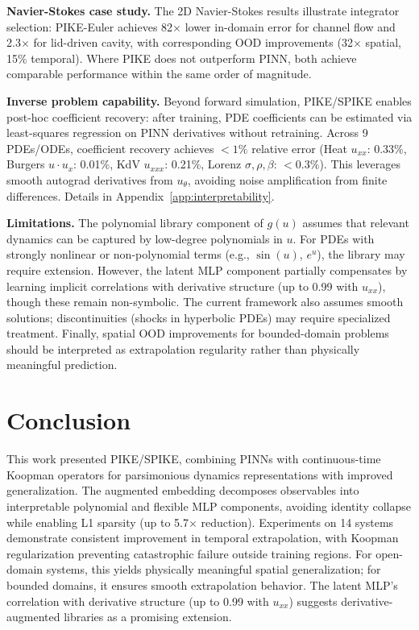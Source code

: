 \documentclass{article}
\theoremstyle{remark}
\begin{document}
\textbf{Navier-Stokes case study.} The 2D Navier-Stokes results illustrate integrator selection: PIKE-Euler achieves 82$\times$ lower in-domain error for channel flow and 2.3$\times$ for lid-driven cavity, with corresponding OOD improvements (32$\times$ spatial, 15\% temporal). Where PIKE does not outperform PINN, both achieve comparable performance within the same order of magnitude.

\textbf{Inverse problem capability.} Beyond forward simulation, PIKE/SPIKE enables post-hoc coefficient recovery: after training, PDE coefficients can be estimated via least-squares regression on PINN derivatives without retraining. Across 9 PDEs/ODEs, coefficient recovery achieves $<1\%$ relative error (Heat $u_{xx}$: 0.33\%, Burgers $u \cdot u_x$: 0.01\%, KdV $u_{xxx}$: 0.21\%, Lorenz $\sigma, \rho, \beta$: $<0.3\%$). This leverages smooth autograd derivatives from $u_\theta$, avoiding noise amplification from finite differences. Details in Appendix~\ref{app:interpretability}.

\textbf{Limitations.} The polynomial library component of $g(u)$ assumes that relevant dynamics can be captured by low-degree polynomials in $u$. For PDEs with strongly nonlinear or non-polynomial terms (e.g., $\sin(u)$, $e^u$), the library may require extension. However, the latent MLP component partially compensates by learning implicit correlations with derivative structure (up to 0.99 with $u_{xx}$), though these remain non-symbolic. The current framework also assumes smooth solutions; discontinuities (shocks in hyperbolic PDEs) may require specialized treatment. Finally, spatial OOD improvements for bounded-domain problems should be interpreted as extrapolation regularity rather than physically meaningful prediction.

\section{Conclusion}

This work presented PIKE/SPIKE, combining PINNs with continuous-time Koopman operators for parsimonious dynamics representations with improved generalization. The augmented embedding decomposes observables into interpretable polynomial and flexible MLP components, avoiding identity collapse while enabling L1 sparsity (up to 5.7$\times$ reduction). Experiments on 14 systems demonstrate consistent improvement in temporal extrapolation, with Koopman regularization preventing catastrophic failure outside training regions. For open-domain systems, this yields physically meaningful spatial generalization; for bounded domains, it ensures smooth extrapolation behavior. The latent MLP's correlation with derivative structure (up to 0.99 with $u_{xx}$) suggests derivative-augmented libraries as a promising extension.
\end{document}
